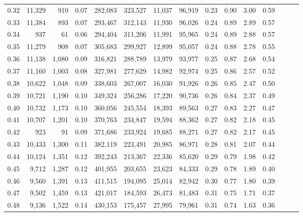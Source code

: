 \begin{tabular}{rrrrrrrrrrrrrrr}
0.32 &  11,329 &    910 &  0.07 &  282,083 &  323,527 &   11,037 &   96,919 &  0.23 &  0.90 &  3.00 &      0.59 \\
0.33 &  11,384 &    893 &  0.07 &  293,467 &  312,143 &   11,930 &   96,026 &  0.24 &  0.89 &  2.89 &      0.57 \\
0.34 &     937 &     61 &  0.06 &  294,404 &  311,206 &   11,991 &   95,965 &  0.24 &  0.89 &  2.88 &      0.57 \\
0.35 &  11,279 &    908 &  0.07 &  305,683 &  299,927 &   12,899 &   95,057 &  0.24 &  0.88 &  2.78 &      0.55 \\
0.36 &  11,138 &  1,080 &  0.09 &  316,821 &  288,789 &   13,979 &   93,977 &  0.25 &  0.87 &  2.68 &      0.54 \\
0.37 &  11,160 &  1,003 &  0.08 &  327,981 &  277,629 &   14,982 &   92,974 &  0.25 &  0.86 &  2.57 &      0.52 \\
0.38 &  10,622 &  1,048 &  0.09 &  338,603 &  267,007 &   16,030 &   91,926 &  0.26 &  0.85 &  2.47 &      0.50 \\
0.39 &  10,721 &  1,190 &  0.10 &  349,324 &  256,286 &   17,220 &   90,736 &  0.26 &  0.84 &  2.37 &      0.49 \\
0.40 &  10,732 &  1,173 &  0.10 &  360,056 &  245,554 &   18,393 &   89,563 &  0.27 &  0.83 &  2.27 &      0.47 \\
0.41 &  10,707 &  1,201 &  0.10 &  370,763 &  234,847 &   19,594 &   88,362 &  0.27 &  0.82 &  2.18 &      0.45 \\
0.42 &     923 &     91 &  0.09 &  371,686 &  233,924 &   19,685 &   88,271 &  0.27 &  0.82 &  2.17 &      0.45 \\
0.43 &  10,433 &  1,300 &  0.11 &  382,119 &  223,491 &   20,985 &   86,971 &  0.28 &  0.81 &  2.07 &      0.44 \\
0.44 &  10,124 &  1,351 &  0.12 &  392,243 &  213,367 &   22,336 &   85,620 &  0.29 &  0.79 &  1.98 &      0.42 \\
0.45 &   9,712 &  1,287 &  0.12 &  401,955 &  203,655 &   23,623 &   84,333 &  0.29 &  0.78 &  1.89 &      0.40 \\
0.46 &   9,560 &  1,391 &  0.13 &  411,515 &  194,095 &   25,014 &   82,942 &  0.30 &  0.77 &  1.80 &      0.39 \\
0.47 &   9,502 &  1,459 &  0.13 &  421,017 &  184,593 &   26,473 &   81,483 &  0.31 &  0.75 &  1.71 &      0.37 \\
0.48 &   9,136 &  1,522 &  0.14 &  430,153 &  175,457 &   27,995 &   79,961 &  0.31 &  0.74 &  1.63 &      0.36 \\

\end{tabular}
